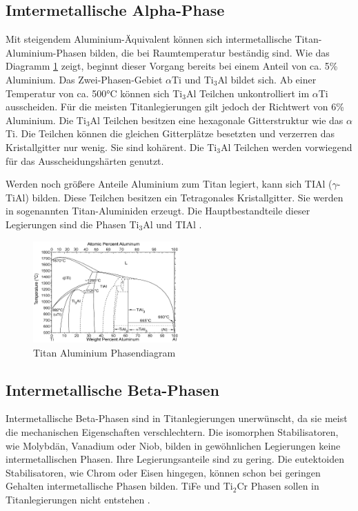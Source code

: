 \documentclass[a4paper, 11pt]{tubsreprt}
\begin{document}
\subsection{Imtermetallische Alpha-Phase}
Mit steigendem Aluminium-Äquivalent können sich intermetallische Titan-Aluminium-Phasen bilden, die bei Raumtemperatur beständig sind. Wie das Diagramm \ref{Titan Aluminium Phasendiagramm} zeigt, beginnt dieser Vorgang bereits bei einem Anteil von ca. 5\% Aluminium. Das Zwei-Phasen-Gebiet $\alpha$Ti und Ti$_{3}$Al bildet sich. Ab einer Temperatur von ca. 500°C können sich Ti$_{3}$Al Teilchen unkontrolliert im $\alpha$Ti ausscheiden. Für die meisten Titanlegierungen gilt jedoch der Richtwert von 6\% Aluminium. Die Ti$_{3}$Al Teilchen besitzen eine hexagonale Gitterstruktur wie das $\alpha$Ti. Die Teilchen können die gleichen Gitterplätze besetzten und verzerren das Kristallgitter nur wenig. Sie sind kohärent. Die Ti$_{3}$Al Teilchen werden vorwiegend für das Ausscheidungshärten genutzt.   

Werden noch größere Anteile Aluminium zum Titan legiert, kann sich TIAl ($\gamma$-TiAl) bilden. Diese Teilchen besitzen ein Tetragonales Kristallgitter. Sie werden in sogenannten Titan-Aluminiden erzeugt. Die Hauptbestandteile dieser Legierungen sind die Phasen Ti$_{3}$Al und TIAl \cite{Luetjering2007}.   
  
\begin{figure}
\centering
\includegraphics[width=0.5\textwidth]{Bilder/Titanaluminide.png}
\caption[Titan Aluminium Phasendiagramm]{Titan Aluminium Phasendiagram\cite{Luetjering2007}}
\label{Titan Aluminium Phasendiagramm}
\end{figure}
 
\subsection{Intermetallische Beta-Phasen}
Intermetallische Beta-Phasen sind in Titanlegierungen unerwünscht, da sie meist die mechanischen Eigenschaften verschlechtern. Die isomorphen Stabilisatoren, wie Molybdän, Vanadium oder Niob, bilden in gewöhnlichen Legierungen keine intermetallischen Phasen. Ihre Legierungsanteile sind zu gering. Die eutektoiden Stabilisatoren, wie Chrom oder Eisen hingegen, können schon bei geringen Gehalten intermetallische Phasen bilden. TiFe und Ti$_{2}$Cr Phasen sollen in Titanlegierungen nicht entstehen \cite[vgl.]{Luetjering2007}.   
\end{document}
